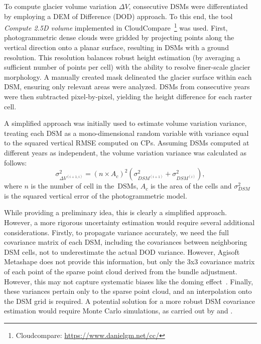 To compute glacier volume variation $ \Delta V $, consecutive DSMs were differentiated
by employing a DEM of Difference (DOD) approach.
To this end, the tool \textit{Compute 2.5D volume} implemented in 
CloudCompare~\footnote{Cloudcompare: \url{https://www.danielgm.net/cc/}} was used.
First, photogrammetric dense clouds were gridded by projecting points along the vertical
direction onto a planar surface, resulting in DSMs with a  ground resolution.
This resolution balances robust height estimation (by averaging a sufficient number of points per cell) 
with the ability to resolve finer-scale glacier morphology.
A manually created mask delineated the glacier surface within each DSM, ensuring only 
relevant areas were analyzed.  
DSMs from consecutive years were then subtracted pixel-by-pixel, yielding the height 
difference for each raster cell.

A simplified approach was initially used to estimate volume variation variance, 
treating each DSM as a mono-dimensional random variable with variance equal to the squared 
vertical RMSE computed on CPs.
Assuming DSMs computed at different years as independent, the volume variation variance 
was calculated as follows:
\begin{equation}
    \sigma^2_{\Delta V^{(i+1,i)}}  = {(n \times A_c)}^2 \left( \sigma^2
    _{DSM^{(i+1)}} + \sigma^2_{DSM^{(i)}} \right),
    \label{eq:3:volVarProp}
\end{equation}
where $ n $ is the number of cell in the~DSMs, $A_c$ is the area of the cells
and $ \sigma^2 _{DSM}$ is the squared vertical error of the photogrammetric model.

While providing a preliminary idea, this is clearly a simplified approach. 
However, a more rigorous uncertainty estimation would require several additional considerations.
Firstly, to propagate variance accurately, we need the full covariance matrix of each DSM, 
including the covariances between neighboring DSM cells, not to underestimate the actual DOD variance. 
However, Agisoft Metashape does not provide this information, but only the 3x3 covariance matrix of each point of the sparse point cloud derived from the bundle adjustment.
However, this may not capture systematic biases like the doming effect~\citep{James2014_mitigating, James2020_mitigating2}.
Finally, these variances pertain only to the sparse point cloud, and an interpolation onto the DSM grid is required.
A potential solution for a more robust DSM covariance estimation would require Monte Carlo simulations, as carried out by \citet{James2017_3duncertainty} and \citet{Roncella2021_montecarlo}.

